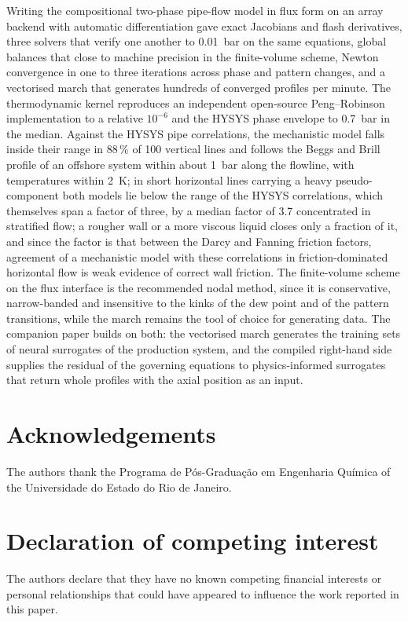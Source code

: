 \documentclass[a4paper,fleqn]{cas-sc}
\begin{document}
Writing the compositional two-phase pipe-flow model in flux form on an array backend with automatic differentiation gave exact Jacobians and flash derivatives, three solvers that verify one another to \SI{0.01}{\bar} on the same equations, global balances that close to machine precision in the finite-volume scheme, Newton convergence in one to three iterations across phase and pattern changes, and a vectorised march that generates hundreds of converged profiles per minute. The thermodynamic kernel reproduces an independent open-source Peng--Robinson implementation to a relative $10^{-6}$ and the HYSYS phase envelope to \SI{0.7}{\bar} in the median. Against the HYSYS pipe correlations, the mechanistic model falls inside their range in 88\,\% of 100 vertical lines and follows the Beggs and Brill profile of an offshore system within about \SI{1}{\bar} along the flowline, with temperatures within \SI{2}{\kelvin}; in short horizontal lines carrying a heavy pseudo-component both models lie below the range of the HYSYS correlations, which themselves span a factor of three, by a median factor of 3.7 concentrated in stratified flow; a rougher wall or a more viscous liquid closes only a fraction of it, and since the factor is that between the Darcy and Fanning friction factors, agreement of a mechanistic model with these correlations in friction-dominated horizontal flow is weak evidence of correct wall friction. The finite-volume scheme on the flux interface is the recommended nodal method, since it is conservative, narrow-banded and insensitive to the kinks of the dew point and of the pattern transitions, while the march remains the tool of choice for generating data. The companion paper \citep{carvalho2026b} builds on both: the vectorised march generates the training sets of neural surrogates of the production system, and the compiled right-hand side supplies the residual of the governing equations to physics-informed surrogates that return whole profiles with the axial position as an input.

\section*{Acknowledgements}
The authors thank the Programa de P\'os-Gradua\c{c}\~ao em Engenharia Qu\'imica of the Universidade do Estado do Rio de Janeiro.

\section*{Declaration of competing interest}
The authors declare that they have no known competing financial interests or personal relationships that could have appeared to influence the work reported in this paper.
\end{document}
